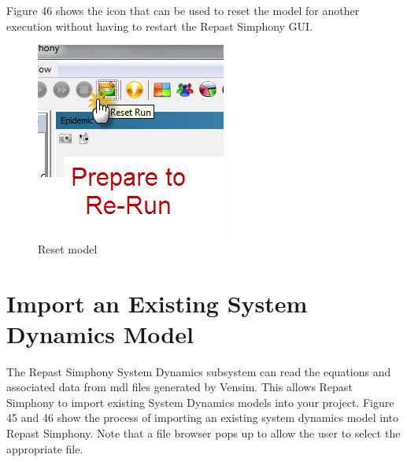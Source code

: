 \documentclass[11pt]{amsart}
\begin{document}
Figure 46 shows the icon that can be used to reset the model for another execution without having to restart the Repast Simphony GUI.


\begin{figure}[ht]
\begin{center}
\vspace{.2in}
\centerline {
\includegraphics[totalheight=0.2\textheight]{images/044.jpg}
}
\caption{Reset model}
\label{fig:044}
\end{center}
\end{figure}

\newpage

\section{Import an Existing System Dynamics Model}
The Repast Simphony System Dynamics subsystem can read the equations and associated data from  mdl files generated by Vensim. This allows Repast Simphony to import existing System Dynamics models into your project. Figure 45 and 46 show the process of importing an existing system dynamics model into Repast Simphony. Note that a file browser pops up to allow the user to select the appropriate file.
\end{document}
